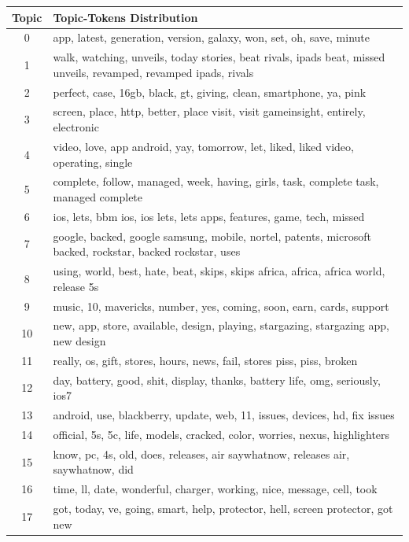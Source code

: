 \begin{longtable}{c p{16cm}} \toprule
  Topic & Topic-Tokens Distribution \\ \midrule
   0    & app, latest, generation, version, galaxy, won, set, oh, save, minute \\ \midrule
   1    & walk, watching, unveils, today stories, beat rivals, ipads beat, missed unveils, revamped, revamped ipads, rivals \\ \midrule
   2    & perfect, case, 16gb, black, gt, giving, clean, smartphone, ya, pink \\ \midrule
   3    & screen, place, http, better, place visit, visit gameinsight, entirely, electronic \\ \midrule
   4    & video, love, app android, yay, tomorrow, let, liked, liked video, operating, single \\ \midrule
   5    & complete, follow, managed, week, having, girls, task, complete task, managed complete \\ \midrule
   6    & ios, lets, bbm ios, ios lets, lets apps, features, game, tech, missed \\ \midrule
   7    & google, backed, google samsung, mobile, nortel, patents, microsoft backed, rockstar, backed rockstar, uses \\ \midrule
   8    & using, world, best, hate, beat, skips, skips africa, africa, africa world, release 5s \\ \midrule
   9    & music, 10, mavericks, number, yes, coming, soon, earn, cards, support \\ \midrule
   10   & new, app, store, available, design, playing, stargazing, stargazing app, new design \\ \midrule
   11   & really, os, gift, stores, hours, news, fail, stores piss, piss, broken \\ \midrule
   12   & day, battery, good, shit, display, thanks, battery life, omg, seriously, ios7 \\ \midrule
   13   & android, use, blackberry, update, web, 11, issues, devices, hd, fix issues \\ \midrule
   14   & official, 5s, 5c, life, models, cracked, color, worries, nexus, highlighters \\ \midrule
   15   & know, pc, 4s, old, does, releases, air saywhatnow, releases air, saywhatnow, did \\ \midrule
   16   & time, ll, date, wonderful, charger, working, nice, message, cell, took \\ \midrule
   17   & got, today, ve, going, smart, help, protector, hell, screen protector, got new \\ \midrule

\end{longtable}
